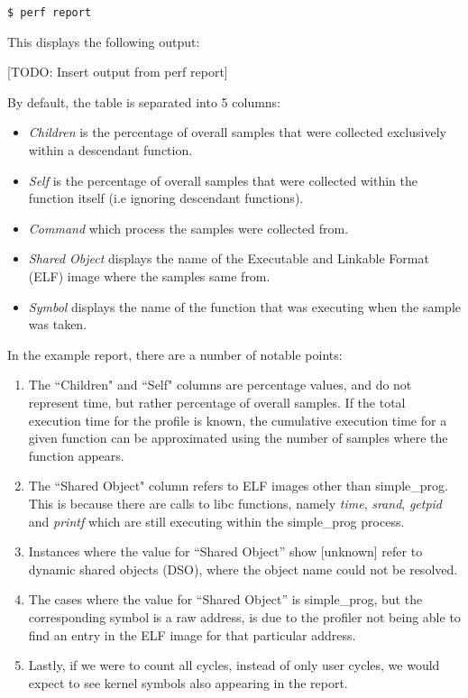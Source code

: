 \lstset{language=bash}
\begin{lstlisting}
$ perf report
\end{lstlisting}

This displays the following output:

[TODO: Insert output from perf report]

By default, the table is separated into 5 columns:

\ssp
\begin{itemize}
    \item \textit{Children} is the percentage of overall samples that were collected exclusively within a descendant function.
    \item \textit{Self} is the percentage of overall samples that were collected within the function itself (i.e ignoring descendant functions).
    \item \textit{Command} which process the samples were collected from.
    \item \textit{Shared Object} displays the name of the Executable and Linkable Format (ELF) image where the samples same from.
    \item \textit{Symbol} displays the name of the function that was executing when the sample was taken.
\end{itemize}
\dsp

In the example report, there are a number of notable points:
\ssp
\begin{enumerate}
    \item The ``Children" and ``Self" columns are percentage values, and do not represent time, but rather percentage of overall samples. If the total execution time for the profile is known, the cumulative execution time for a given function can be approximated using the number of samples where the function appears. 
    \item The ``Shared Object" column refers to ELF images other than simple\_prog. This is because there are calls to libc functions, namely \textit{time}, \textit{srand}, \textit{getpid} and \textit{printf} which are still executing within the simple\_prog process.
    \item Instances where the value for ``Shared Object'' show [unknown] refer to dynamic shared objects (DSO), where the object name could not be resolved.
    \item The cases where the value for ``Shared Object'' is simple\_prog, but the corresponding symbol is a raw address, is due to the profiler not being able to find an entry in the ELF image for that particular address.
    \item Lastly, if we were to count all cycles, instead of only user cycles, we would expect to see kernel symbols also appearing in the report.
\end{enumerate}
\dsp

